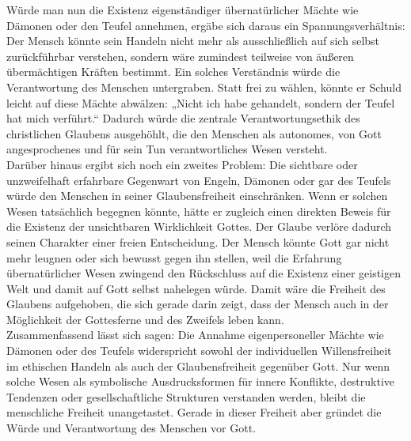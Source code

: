 Würde man nun die Existenz eigenständiger übernatürlicher Mächte wie Dämonen oder den Teufel annehmen, ergäbe sich daraus ein Spannungsverhältnis: Der Mensch könnte sein Handeln nicht mehr als ausschließlich auf sich selbst zurückführbar verstehen, sondern wäre zumindest teilweise von äußeren übermächtigen Kräften bestimmt. Ein solches Verständnis würde die Verantwortung des Menschen untergraben. Statt frei zu wählen, könnte er Schuld leicht auf diese Mächte abwälzen: „Nicht ich habe gehandelt, sondern der Teufel hat mich verführt.“ Dadurch würde die zentrale Verantwortungsethik des christlichen Glaubens ausgehöhlt, die den Menschen als autonomes, von Gott angesprochenes und für sein Tun verantwortliches Wesen versteht.\\

Darüber hinaus ergibt sich noch ein zweites Problem: Die sichtbare oder unzweifelhaft erfahrbare Gegenwart von Engeln, Dämonen oder gar des Teufels würde den Menschen in seiner Glaubensfreiheit einschränken. Wenn er solchen Wesen tatsächlich begegnen könnte, hätte er zugleich einen direkten Beweis für die Existenz der unsichtbaren Wirklichkeit Gottes. Der Glaube verlöre dadurch seinen Charakter einer freien Entscheidung. Der Mensch könnte Gott gar nicht mehr leugnen oder sich bewusst gegen ihn stellen, weil die Erfahrung übernatürlicher Wesen zwingend den Rückschluss auf die Existenz einer geistigen Welt und damit auf Gott selbst nahelegen würde. Damit wäre die Freiheit des Glaubens aufgehoben, die sich gerade darin zeigt, dass der Mensch auch in der Möglichkeit der Gottesferne und des Zweifels leben kann.\\

Zusammenfassend lässt sich sagen: Die Annahme eigenpersoneller Mächte wie Dämonen oder des Teufels widerspricht sowohl der individuellen Willensfreiheit im ethischen Handeln als auch der Glaubensfreiheit gegenüber Gott. Nur wenn solche Wesen als symbolische Ausdrucksformen für innere Konflikte, destruktive Tendenzen oder gesellschaftliche Strukturen verstanden werden, bleibt die menschliche Freiheit unangetastet. Gerade in dieser Freiheit aber gründet die Würde und Verantwortung des Menschen vor Gott.\\

